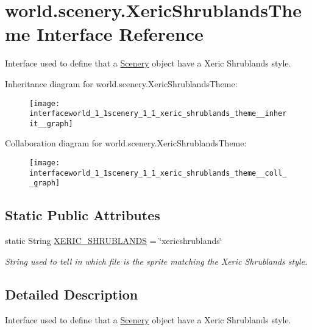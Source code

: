 \hypertarget{interfaceworld_1_1scenery_1_1_xeric_shrublands_theme}{\section{world.\-scenery.\-Xeric\-Shrublands\-Theme Interface Reference}
\label{interfaceworld_1_1scenery_1_1_xeric_shrublands_theme}
}


Interface used to define that a \hyperlink{classworld_1_1scenery_1_1_scenery}{Scenery} object have a Xeric Shrublands style.  




Inheritance diagram for world.\-scenery.\-Xeric\-Shrublands\-Theme\-:\nopagebreak
\begin{figure}[H]
\begin{center}
\leavevmode
\texttt{[image: interfaceworld\_1\_1scenery\_1\_1\_xeric\_shrublands\_theme\_\_inherit\_\_graph]}
\end{center}
\end{figure}


Collaboration diagram for world.\-scenery.\-Xeric\-Shrublands\-Theme\-:\nopagebreak
\begin{figure}[H]
\begin{center}
\leavevmode
\texttt{[image: interfaceworld\_1\_1scenery\_1\_1\_xeric\_shrublands\_theme\_\_coll\_\_graph]}
\end{center}
\end{figure}
\subsection*{Static Public Attributes}
\begin{DoxyCompactItemize}
\item 
static String \hyperlink{interfaceworld_1_1scenery_1_1_xeric_shrublands_theme_a03cab029cbad9fdfa722122d3393c06c}{X\-E\-R\-I\-C\-\_\-\-S\-H\-R\-U\-B\-L\-A\-N\-D\-S} = \char`\"{}xericshrublands\char`\"{}
\begin{DoxyCompactList}\small\item\em String used to tell in which file is the sprite matching the Xeric Shrublands style. \end{DoxyCompactList}\end{DoxyCompactItemize}


\subsection{Detailed Description}
Interface used to define that a \hyperlink{classworld_1_1scenery_1_1_scenery}{Scenery} object have a Xeric Shrublands style. 

